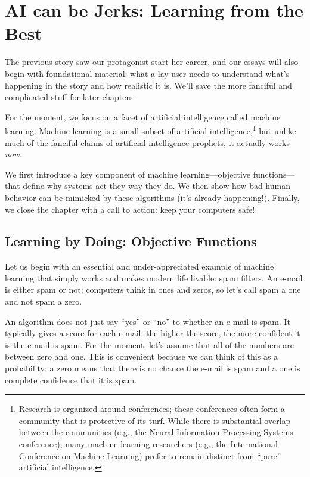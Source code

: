 
\newcommand{\salesjerk}[0]{Levi}

\chapter{AI can be Jerks: Learning from the Best}

The previous story saw our protagonist start her career, and our
essays will also begin with foundational material: what a lay user needs
to understand what's happening in the story and how realistic it is.
We'll save the more fanciful and complicated stuff for later chapters.

For the moment, we focus on a facet of artificial intelligence called
machine learning.  Machine learning is a small subset of artificial
intelligence,\footnote{Research is organized around conferences; these
  conferences often form a community that is protective of its turf.
  While there is substantial overlap between the communities (e.g.,
  the Neural Information Processing Systems conference), many machine
  learning researchers (e.g., the International Conference on Machine
  Learning) prefer to remain distinct from ``pure'' artificial
  intelligence.} but unlike much of the fanciful claims of artificial
intelligence prophets, it actually works \emph{now}.


We first introduce a key component of machine learning---objective
functions---that define why systems act they way they do. We then show
how bad human behavior can be mimicked by these algorithms (it's
already happening!).  Finally, we close the chapter with a call to
action: keep your computers safe!

\section{Learning by Doing: Objective Functions}
\label{sec:objective-functions}

Let us begin with an essential and under-appreciated example of machine
learning that simply works and makes modern life livable: spam
filters.  An e-mail is either spam or not; computers think in ones and
zeros, so let's call spam a one and not spam a zero.

An algorithm does not just say ``yes'' or ``no'' to whether an e-mail
is spam.  It typically gives a score for each e-mail: the higher the
score, the more confident it is the e-mail is spam.  For the moment,
let's assume that all of the numbers are between zero and one.  This
is convenient because we can think of this as a probability: a zero
means that there is no chance the e-mail is spam and a one is complete
confidence that it is spam.

